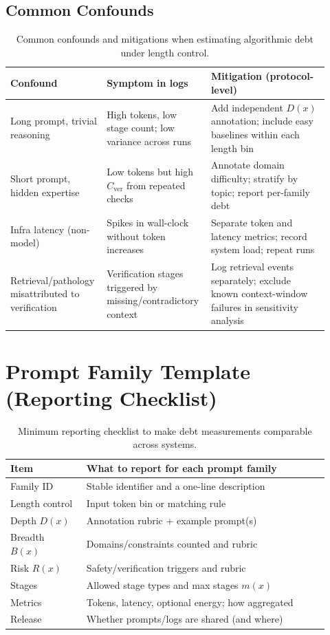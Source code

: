 \documentclass{svjour3}
\begin{document}
\subsection{Common Confounds}
\begin{table}[t]
\centering
\small
\caption{Common confounds and mitigations when estimating algorithmic debt under length control.}
\label{tab:confounds}
\small
\begin{tabular}{@{}p{0.28\linewidth}p{0.28\linewidth}p{0.36\linewidth}@{}}
\toprule
Confound & Symptom in logs & Mitigation (protocol-level) \\
\midrule
Long prompt, trivial reasoning & High tokens, low stage count; low variance across runs & Add independent $D(x)$ annotation; include easy baselines within each length bin \\
Short prompt, hidden expertise & Low tokens but high $C_{\text{ver}}$ from repeated checks & Annotate domain difficulty; stratify by topic; report per-family debt \\
Infra latency (non-model) & Spikes in wall-clock without token increases & Separate token and latency metrics; record system load; repeat runs \\
Retrieval/pathology misattributed to verification & Verification stages triggered by missing/contradictory context & Log retrieval events separately; exclude known context-window failures in sensitivity analysis \\
\bottomrule
\end{tabular}
\end{table}

\section{Prompt Family Template (Reporting Checklist)}
\begin{table}[t]
\centering
\small
\begin{tabular}{p{0.22\linewidth}p{0.70\linewidth}}
\toprule
Item & What to report for each prompt family \\
\midrule
Family ID & Stable identifier and a one-line description \\
Length control & Input token bin or matching rule \\
Depth $D(x)$ & Annotation rubric + example prompt(s) \\
Breadth $B(x)$ & Domains/constraints counted and rubric \\
Risk $R(x)$ & Safety/verification triggers and rubric \\
Stages & Allowed stage types and max stages $m(x)$ \\
Metrics & Tokens, latency, optional energy; how aggregated \\
Release & Whether prompts/logs are shared (and where) \\
\bottomrule
\end{tabular}
\caption{Minimum reporting checklist to make debt measurements comparable across systems.}
\label{tab:checklist}
\end{table}
\end{document}
